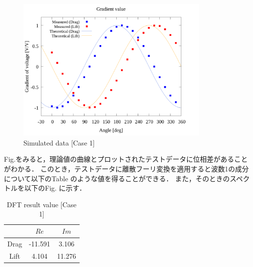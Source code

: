 \begin{figure}[htbp]
    \footnotesize
    \begin{center}
        \includegraphics[width=95mm]{../../02_workspace/result/rotation_tx=15.0_tx=20.0/plot/20/20_adjust-value.png}
        \caption{Simulated data [Case 1]}
    \end{center}
\end{figure}

Fig.をみると，理論値の曲線とプロットされたテストデータに位相差があることがわかる．
このとき，テストデータに離散フーリ変換を適用すると波数1の成分について以下のTable のような値を得ることができる．
また，そのときのスペクトルを以下のFig. に示す．

\begin{table}[htbp]
    \begin{center}
        \caption{DFT result value [Case 1]}
        \begin{tabular}{|p{30mm}|p{20mm}|p{20mm}|}
            \hline
            \multicolumn{1}{|c|}{}     & \multicolumn{1}{|c|}{$Re$}    & \multicolumn{1}{|c|}{$Im$}   \\ \hline
            \multicolumn{1}{|c|}{Drag} & \multicolumn{1}{|c|}{-11.591} & \multicolumn{1}{|c|}{3.106}  \\ \hline
            \multicolumn{1}{|c|}{Lift} & \multicolumn{1}{|c|}{4.104}   & \multicolumn{1}{|c|}{11.276} \\ \hline
        \end{tabular}
    \end{center}
\end{table}


